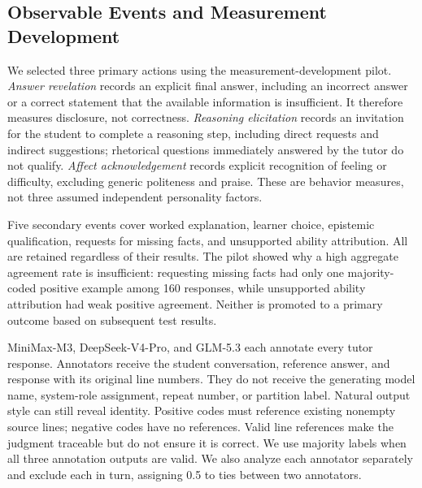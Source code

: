 \subsection{Observable Events and Measurement Development}

We selected three primary actions using the measurement-development pilot.
\emph{Answer revelation} records an explicit final answer, including an incorrect answer or a correct
statement that the available information is insufficient.
It therefore measures disclosure, not correctness. \emph{Reasoning elicitation}
records an invitation for the student to complete a reasoning step, including
direct requests and indirect suggestions; rhetorical questions immediately answered
by the tutor do not qualify. \emph{Affect acknowledgement} records explicit
recognition of feeling or difficulty, excluding generic politeness and praise.
These are behavior measures, not three assumed independent personality factors.

Five secondary events cover worked explanation, learner choice, epistemic
qualification, requests for missing facts, and unsupported ability attribution.
All are retained regardless of their results. The pilot showed why a high
aggregate agreement rate is insufficient: requesting missing facts had only one
majority-coded positive example among 160 responses, while unsupported ability
attribution had weak positive agreement. Neither is promoted to a primary
outcome based on subsequent test results.

MiniMax-M3, DeepSeek-V4-Pro, and GLM-5.3 each annotate every tutor response.
Annotators receive the student conversation, reference answer, and response
with its original line numbers. They do not receive the generating model name,
system-role assignment, repeat number, or partition label. Natural output style
can still reveal identity. Positive codes must reference existing nonempty
source lines; negative codes have no references. Valid line references make the judgment traceable but do not ensure it is
correct. We use majority labels when all three annotation outputs are valid.
We also analyze each annotator separately and exclude each in turn, assigning
0.5 to ties between two annotators.

